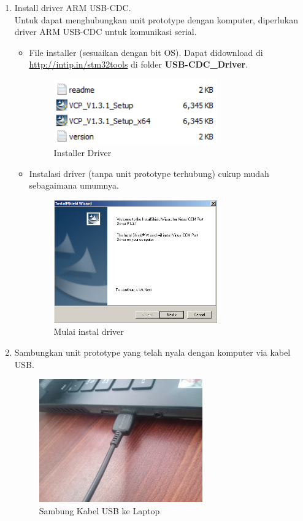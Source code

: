 \documentclass[12pt]{book}
\begin{document}
    \begin{enumerate}
    	\item Install driver ARM USB-CDC.\\
    	Untuk dapat menghubungkan unit prototype dengan komputer,
    	diperlukan driver ARM USB-CDC untuk komunikasi serial.

    	\begin{itemize}
    		\item File installer (sesuaikan dengan bit OS).
    		Dapat didownload di \url{http://intip.in/stm32tools} di folder \textbf{USB-CDC\_Driver}.
    		\begin{figure}[!ht]
    			\centering
    			\includegraphics[width=200pt]{images/software/driver}
    			\caption{Installer Driver}
    		\end{figure}

    		\newpage
    		\item Instalasi driver (tanpa unit prototype terhubung) cukup mudah sebagaimana umumnya.
    		\begin{figure}[!ht]
    			\centering
    			\includegraphics[width=200pt]{images/software/install_driver}
    			\caption{Mulai instal driver}
    		\end{figure}
    	\end{itemize}

    	\item Sambungkan unit prototype yang telah nyala dengan komputer via kabel USB.
    	\begin{figure}[!ht]
    		\centering
    		\includegraphics[width=200pt]{images/pasang/laptop_usb}
    		\caption{Sambung Kabel USB ke Laptop}
    	\end{figure}


\end{enumerate}
\end{document}
